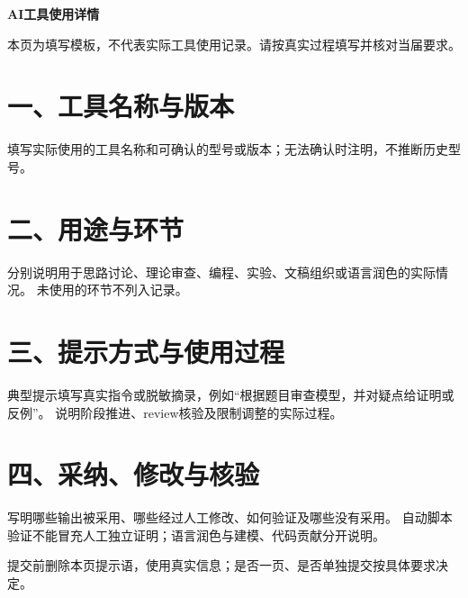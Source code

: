 \documentclass[UTF8,fontset=fandol,zihao=-4]{ctexart}
\begin{document}
\begin{center}{\bfseries AI工具使用详情}\end{center}
\noindent 本页为填写模板，不代表实际工具使用记录。请按真实过程填写并核对当届要求。

\section*{一、工具名称与版本}
填写实际使用的工具名称和可确认的型号或版本；无法确认时注明，不推断历史型号。

\section*{二、用途与环节}
分别说明用于思路讨论、理论审查、编程、实验、文稿组织或语言润色的实际情况。
未使用的环节不列入记录。

\section*{三、提示方式与使用过程}
典型提示填写真实指令或脱敏摘录，例如“根据题目审查模型，并对疑点给证明或反例”。
说明阶段推进、review核验及限制调整的实际过程。

\section*{四、采纳、修改与核验}
写明哪些输出被采用、哪些经过人工修改、如何验证及哪些没有采用。
自动脚本验证不能冒充人工独立证明；语言润色与建模、代码贡献分开说明。

\vfill
\noindent\small 提交前删除本页提示语，使用真实信息；是否一页、是否单独提交按具体要求决定。
\end{document}
